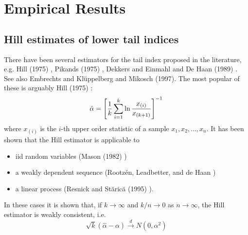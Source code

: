 \documentclass{article}
\newcommand{\E}{
  \mathbb{E}
}
\newcommand{\1}[1]{
  \mathbf{1}_{\{#1\}}
}
\begin{document}


\section{Empirical Results}
\subsection{Hill estimates of lower tail indices}
\label{sec:Hill}
There have been several estimators for the tail index proposed in the
literature, e.g. Hill (1975) \cite{hill1975simple}, Pikands (1975)
\cite{pickands1975statistical}, Dekkers and Einmahl and De Haan (1989)
\cite{dekkers1989moment}. See also Embrechts and Kl\"uppelberg and
Mikosch (1997)\cite{Embrechts1997}. The most popular of these is
arguably Hill (1975) \cite{hill1975simple}:
\[
\hat \alpha = \left[
  {1 \over k} \sum_{i=1}^k \ln {x_{(i)} \over x_{(k+1)}}
  \right]^{-1}
\]
where $x_{(i)}$ is the $i$-th upper order statistic of a sample
$x_1, x_2, ..., x_n$. It has been shown that the Hill estimator is
applicable to 
\begin{itemize}
\item iid random variables (Mason (1982) \cite{mason1982laws})
\item a weakly dependent sequence (Rootz{\'e}n, Leadbetter,
  and de Haan \cite{rootzen1992tail})
\item a linear process (Resnick and St{\u{a}}ric{\u{a}} (1995)
  \cite{resnick1995consistency}).
\end{itemize}
In these cases it is shown that, if $k \to \infty$ and $k/n \to 0$
as $n \to \infty$, the Hill estimator is weakly consistent, i.e.
\[
\sqrt k (\hat \alpha - \alpha) \overset{d}{\to} N(0, \alpha^2)
\]
\end{document}
